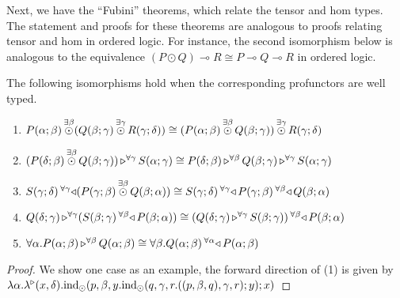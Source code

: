 \documentclass{llncs}
\begin{document}
Next, we have the ``Fubini'' theorems, which relate the tensor and hom
types. The statement and proofs for these theorems are analogous to
proofs relating tensor and hom in ordered logic. For instance, the
second isomorphism below is analogous to the equivalence $(P \odot Q)
\multimap R \cong P \multimap Q \multimap R$ in ordered logic.
\begin{lemma}[{Fubini}]
  \label{lem:fubini-short}
  The following isomorphisms hold when the corresponding profunctors
  are well typed.
  \begin{enumerate}
  \item $\tensorexistsXwithYandZ {\beta} {\harrapp P \alpha \beta} {(\tensorexistsXwithYandZ \gamma {\harrapp Q \beta \gamma} {\harrapp R \gamma \delta})} \cong \tensorexistsXwithYandZ {\gamma} {(\tensorexistsXwithYandZ \beta {\harrapp P \alpha \beta} {\harrapp Q \beta \gamma})} {\harrapp R \gamma \delta}$
  \item $\homrallXYtoZ {\gamma} {(\tensorexistsXwithYandZ \beta {\harrapp P \delta \beta} {\harrapp Q \beta \gamma})} {\harrapp S \alpha \gamma} \cong \homrallXYtoZ \beta {\harrapp P \delta \beta} {\homrallXYtoZ \gamma {\harrapp Q \beta \gamma} {\harrapp S \alpha \gamma}}$
  \item $\homlallXYtoZ {\gamma} {(\tensorexistsXwithYandZ \beta {\harrapp P \gamma \beta} {\harrapp Q \beta \alpha})} {\harrapp S \gamma \delta} \cong \homlallXYtoZ \beta {\harrapp Q \beta \alpha} {\homlallXYtoZ \gamma {\harrapp P \gamma \beta} {\harrapp S \gamma \delta}}$
  \item $\homrallXYtoZ \gamma {\harrapp Q \delta \gamma} {(\homlallXYtoZ \beta {\harrapp P \beta \alpha} {\harrapp S \beta \gamma})} \cong \homlallXYtoZ \beta {\harrapp P \beta \alpha} {(\homrallXYtoZ \gamma {\harrapp Q \delta \gamma} {\harrapp S \beta \gamma})}$
  \item $\pendallXdotY \alpha \homrallXYtoZ \beta {\harrapp P \alpha \beta} {\harrapp Q \alpha \beta} \cong \pendallXdotY \beta \homlallXYtoZ \alpha {\harrapp P \alpha \beta} {\harrapp Q \alpha \beta}$
  \end{enumerate}  
\end{lemma}
\begin{proof}
  We show one case as an example, the forward direction of (1) is
  given by $\lambdaunary \alpha {x} \delta {\tensorelimWkontZ x
    {p,\beta,y. \tensorelimWkontZ y
      {q,\gamma,r. \tensorintroatXwithYandZ {\gamma}
        {\tensorintroatXwithYandZ \beta p q} {r}}}}$
\end{proof}
\end{document}
